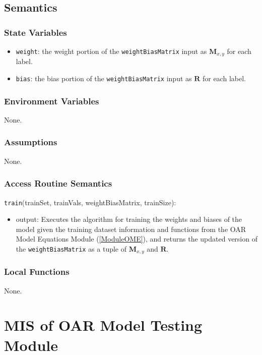 \documentclass[12pt, titlepage]{article}
\def\code#1{\texttt{#1}}
\begin{document}
\subsection{Semantics}

\subsubsection{State Variables}

\begin{itemize}
\item \code{weight}: the weight portion of the \code{weightBiasMatrix} input as $\mathbf{M}_{x,y}$ for each label.
\item \code{bias}: the bias portion of the \code{weightBiasMatrix} input as $\mathbf{R}$ for each label.
\end{itemize}

\subsubsection{Environment Variables}

None.

\subsubsection{Assumptions}

None.

\subsubsection{Access Routine Semantics}

\noindent \code{train}(trainSet, trainVals, weightBiasMatrix, trainSize):
\begin{itemize}
\item output: Executes the algorithm for training the weights and biases of the model given the
training dataset information and functions from the OAR Model Equations Module (\ref{ModuleOME}), and
returns the updated version of the \code{weightBiasMatrix} as a tuple of $\mathbf{M}_{x,y}$ and $\mathbf{R}$.
\end{itemize}

\subsubsection{Local Functions}

None.

\section{MIS of OAR Model Testing Module} \label{ModuleOMTs} 
\end{document}
